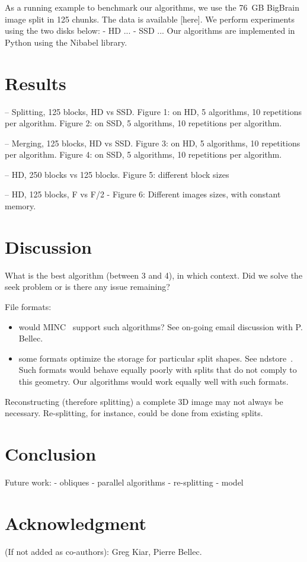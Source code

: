 \documentclass[10pt, conference, compsocconf]{IEEEtran}
\begin{document}
As a running example to benchmark our algorithms, we use the 76~GB
BigBrain image split in 125 chunks. The data is available [here]. We
perform experiments using the two disks below:
- HD ...
- SSD ...
Our algorithms are implemented in Python using the Nibabel library. 

\section{Results}

-- Splitting, 125 blocks, HD vs SSD.
Figure 1: on HD, 5 algorithms, 10 repetitions per algorithm.
Figure 2: on SSD, 5 algorithms, 10 repetitions per algorithm. 

-- Merging, 125 blocks, HD vs SSD.
Figure 3: on HD, 5 algorithms, 10 repetitions per algorithm.
Figure 4: on SSD, 5 algorithms, 10 repetitions per algorithm. 

-- HD, 250 blocks vs 125 blocks. 
Figure 5: different block sizes

-- HD, 125 blocks, F vs F/2
- Figure 6: Different images sizes, with constant memory.

\section{Discussion}

What is the best algorithm (between 3 and 4), in which context. Did we
solve the seek problem or is there any issue remaining?

File formats:
\begin{itemize}
\item would MINC~\cite{vincent2016minc} support such algorithms? See on-going email discussion
with P. Bellec.
\item some formats optimize the storage for particular split shapes. See
  ndstore~\cite{burns2013open}. Such formats would behave equally
  poorly with splits that do not comply to this geometry. Our
  algorithms would work equally well with such formats.
\end{itemize}

Reconstructing (therefore splitting) a complete 3D image may not
always be necessary. Re-splitting, for instance, could be done from
existing splits.

\section{Conclusion}

Future work:
- obliques
- parallel algorithms
- re-splitting
- model

\section*{Acknowledgment}

(If not added as co-authors): Greg Kiar, Pierre Bellec.



\end{document}
